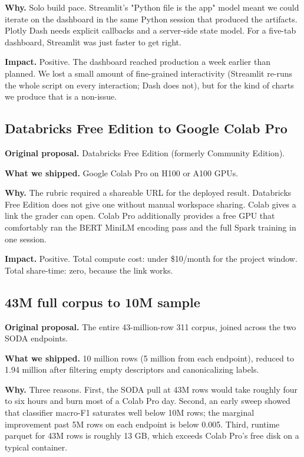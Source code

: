 \documentclass[11pt,letterpaper]{article}
\begin{document}
\textbf{Why.} Solo build pace. Streamlit's "Python file is the app" model meant we could iterate on the dashboard in the same Python session that produced the artifacts. Plotly Dash needs explicit callbacks and a server-side state model. For a five-tab dashboard, Streamlit was just faster to get right.

\textbf{Impact.} Positive. The dashboard reached production a week earlier than planned. We lost a small amount of fine-grained interactivity (Streamlit re-runs the whole script on every interaction; Dash does not), but for the kind of charts we produce that is a non-issue.

\subsection{Databricks Free Edition to Google Colab Pro}

\textbf{Original proposal.} Databricks Free Edition (formerly Community Edition).

\textbf{What we shipped.} Google Colab Pro on H100 or A100 GPUs.

\textbf{Why.} The rubric required a shareable URL for the deployed result. Databricks Free Edition does not give one without manual workspace sharing. Colab gives a link the grader can open. Colab Pro additionally provides a free GPU that comfortably ran the BERT MiniLM encoding pass and the full Spark training in one session.

\textbf{Impact.} Positive. Total compute cost: under \$10/month for the project window. Total share-time: zero, because the link works.

\subsection{43M full corpus to 10M sample}

\textbf{Original proposal.} The entire 43-million-row 311 corpus, joined across the two SODA endpoints.

\textbf{What we shipped.} 10 million rows (5 million from each endpoint), reduced to 1.94 million after filtering empty descriptors and canonicalizing labels.

\textbf{Why.} Three reasons. First, the SODA pull at 43M rows would take roughly four to six hours and burn most of a Colab Pro day. Second, an early sweep showed that classifier macro-F1 saturates well below 10M rows; the marginal improvement past 5M rows on each endpoint is below 0.005. Third, runtime parquet for 43M rows is roughly 13 GB, which exceeds Colab Pro's free disk on a typical container.
\end{document}
